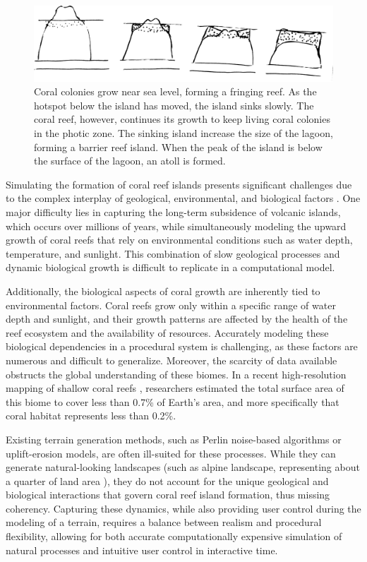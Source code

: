 \begin{figure}[H]
    \centering
    \includegraphics[width = \linewidth]{other_images/Drawings/Darwin_corals.jpg} %
    \caption{Coral colonies grow near sea level, forming a fringing reef. As the hotspot below the island has moved, the island sinks slowly. The coral reef, however, continues its growth to keep living coral colonies in the photic zone. The sinking island increase the size of the lagoon, forming a barrier reef island. When the peak of the island is below the surface of the lagoon, an atoll is formed. }
    \label{fig:coral-island_reef-growth}
\end{figure}

Simulating the formation of coral reef islands presents significant challenges due to the complex interplay of geological, environmental, and biological factors \cite{Hopley2014}. One major difficulty lies in capturing the long-term subsidence of volcanic islands, which occurs over millions of years, while simultaneously modeling the upward growth of coral reefs that rely on environmental conditions such as water depth, temperature, and sunlight. This combination of slow geological processes and dynamic biological growth is difficult to replicate in a computational model.

Additionally, the biological aspects of coral growth are inherently tied to environmental factors. Coral reefs grow only within a specific range of water depth and sunlight, and their growth patterns are affected by the health of the reef ecosystem and the availability of resources. Accurately modeling these biological dependencies in a procedural system is challenging, as these factors are numerous and difficult to generalize. Moreover, the scarcity of data available obstructs the global understanding of these biomes. In a recent high-resolution mapping of shallow coral reefs \cite{Lyons2024}, researchers estimated the total surface area of this biome to cover less than 0.7\% of Earth's area, and more specifically that coral habitat represents less than 0.2\%.

Existing terrain generation methods, such as Perlin noise-based algorithms or uplift-erosion models, are often ill-suited for these processes. While they can generate natural-looking landscapes (such as alpine landscape, representing about a quarter of land area \cite{Korner2014}), they do not account for the unique geological and biological interactions that govern coral reef island formation, thus missing coherency. Capturing these dynamics, while also providing user control during the modeling of a terrain, requires a balance between realism and procedural flexibility, allowing for both accurate computationally expensive simulation of natural processes and intuitive user control in interactive time.


